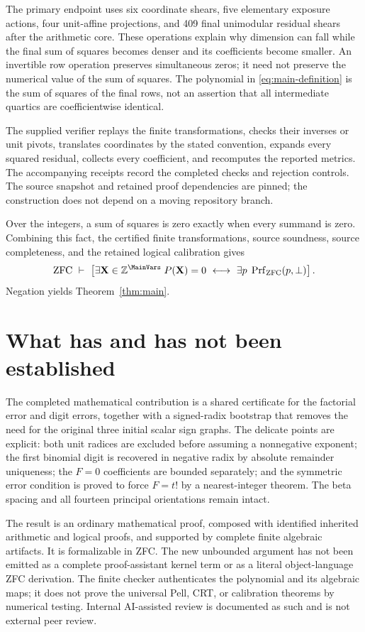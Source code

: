The primary endpoint uses six coordinate shears, five elementary
exposure actions, four unit-affine projections, and 409 final
unimodular residual shears after the arithmetic core.
These operations explain why dimension can fall while the final
sum of squares becomes denser and its coefficients become smaller.
An invertible row operation preserves simultaneous zeros; it need
not preserve the numerical value of the sum of squares.
The polynomial in \eqref{eq:main-definition} is the sum of squares
of the final rows, not an assertion that all intermediate quartics
are coefficientwise identical.

The supplied verifier replays the finite transformations, checks
their inverses or unit pivots, translates coordinates by the stated
convention, expands every squared residual, collects every
coefficient, and recomputes the reported metrics. The accompanying
receipts record the completed checks and rejection controls.
The source snapshot and retained proof dependencies are pinned;
the construction does not depend on a moving repository branch.

Over the integers, a sum of squares is zero exactly when every
summand is zero. Combining this fact, the certified finite
transformations, source soundness, source completeness, and the
retained logical calibration gives
\[
 \mathrm{ZFC}\ \vdash\
 \left[
   \exists\mathbf X\in\mathbb Z^{\MainVars}\;P(\mathbf X)=0
   \ \longleftrightarrow\
   \exists p\;\operatorname{Prf}_{\mathrm{ZFC}}(p,\bot)
 \right].
\]
Negation yields Theorem~\ref{thm:main}.

\section{What has and has not been established}

The completed mathematical contribution is a shared certificate for
the factorial error and digit errors, together with a signed-radix
bootstrap that removes the need for the original three initial
scalar sign graphs. The delicate points are explicit: both unit
radices are excluded before assuming a nonnegative exponent;
the first binomial digit is recovered in negative radix by absolute
remainder uniqueness; the \(F=0\) coefficients are bounded separately;
and the symmetric error condition is proved to force \(F=t!\)
by a nearest-integer theorem. The beta spacing and all fourteen
principal orientations remain intact.

The result is an ordinary mathematical proof, composed with identified
inherited arithmetic and logical proofs, and supported by complete
finite algebraic artifacts. It is formalizable in ZFC. The new
unbounded argument has not been emitted as a complete proof-assistant
kernel term or as a literal object-language ZFC derivation.
The finite checker authenticates the polynomial and its algebraic
maps; it does not prove the universal Pell, CRT, or calibration
theorems by numerical testing. Internal AI-assisted review is
documented as such and is not external peer review.

